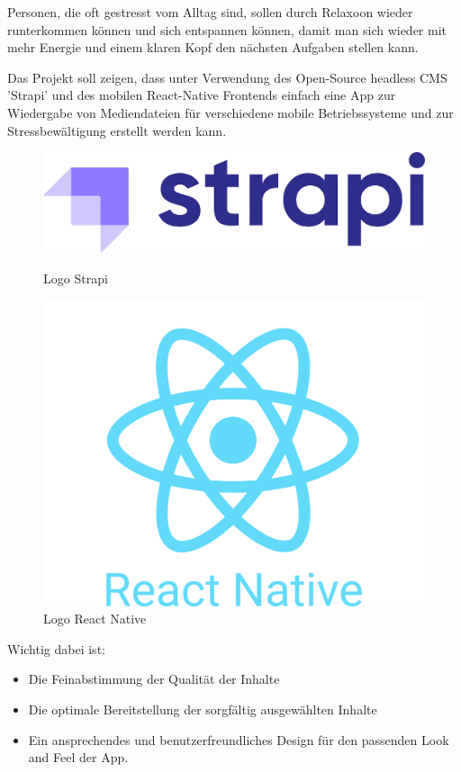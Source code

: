 
Personen, die oft gestresst vom Alltag sind, sollen durch Relaxoon wieder runterkommen können
und sich entspannen können, damit man sich wieder mit mehr Energie und einem klaren Kopf den
nächsten Aufgaben stellen kann.

Das Projekt soll zeigen, dass unter Verwendung des Open-Source headless CMS 'Strapi' und des mobilen
React-Native Frontends einfach eine App zur Wiedergabe von Mediendateien für verschiedene mobile Betriebssysteme
und zur Stressbewältigung erstellt werden kann. 


\begin{figure}[H]
    \begin{minipage}{0.5\textwidth}
        \centering
        \includegraphics[height=0.2\textwidth]{./pics/strapi-logo.png}
        \caption{Logo Strapi}
    \end{minipage}
    \begin{minipage}{0.5\textwidth}
        \centering
        \includegraphics[height=0.6\textwidth]{./pics/react-native-logo.png}
        \caption{Logo React Native}
    \end{minipage}
\end{figure}

Wichtig dabei ist: 

\begin{itemize}
    \item Die Feinabstimmung der Qualität der Inhalte
    \item Die optimale Bereitstellung der sorgfältig ausgewählten Inhalte
    \item Ein ansprechendes und benutzerfreundliches Design für den passenden Look and Feel der App.
\end{itemize}


